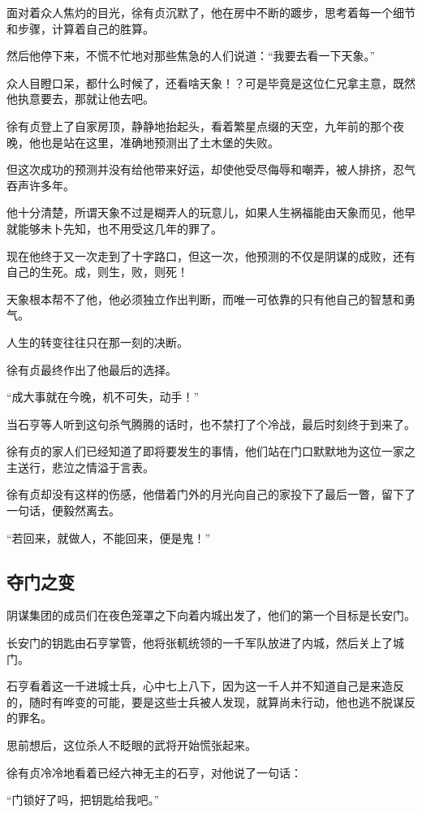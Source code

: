 \begin{multicols}{\theparacolNo}
面对着众人焦灼的目光，徐有贞沉默了，他在房中不断的踱步，思考着每一个细节和步骤，计算着自己的胜算。

然后他停下来，不慌不忙地对那些焦急的人们说道：“我要去看一下天象。”

众人目瞪口呆，都什么时候了，还看啥天象！？可是毕竟是这位仁兄拿主意，既然他执意要去，那就让他去吧。

徐有贞登上了自家房顶，静静地抬起头，看着繁星点缀的天空，九年前的那个夜晚，他也是站在这里，准确地预测出了土木堡的失败。

但这次成功的预测并没有给他带来好运，却使他受尽侮辱和嘲弄，被人排挤，忍气吞声许多年。

他十分清楚，所谓天象不过是糊弄人的玩意儿，如果人生祸福能由天象而见，他早就能够未卜先知，也不用受这几年的罪了。

现在他终于又一次走到了十字路口，但这一次，他预测的不仅是阴谋的成败，还有自己的生死。成，则生，败，则死！

天象根本帮不了他，他必须独立作出判断，而唯一可依靠的只有他自己的智慧和勇气。

人生的转变往往只在那一刻的决断。

徐有贞最终作出了他最后的选择。

“成大事就在今晚，机不可失，动手！”

当石亨等人听到这句杀气腾腾的话时，也不禁打了个冷战，最后时刻终于到来了。

徐有贞的家人们已经知道了即将要发生的事情，他们站在门口默默地为这位一家之主送行，悲泣之情溢于言表。

徐有贞却没有这样的伤感，他借着门外的月光向自己的家投下了最后一瞥，留下了一句话，便毅然离去。

“若回来，就做人，不能回来，便是鬼！”

\subsection{夺门之变}
阴谋集团的成员们在夜色笼罩之下向着内城出发了，他们的第一个目标是长安门。

长安门的钥匙由石亨掌管，他将张軏统领的一千军队放进了内城，然后关上了城门。

石亨看着这一千进城士兵，心中七上八下，因为这一千人并不知道自己是来造反的，随时有哗变的可能，要是这些士兵被人发现，就算尚未行动，他也逃不脱谋反的罪名。

思前想后，这位杀人不眨眼的武将开始慌张起来。

徐有贞冷冷地看着已经六神无主的石亨，对他说了一句话：

“门锁好了吗，把钥匙给我吧。”


\end{multicols}

